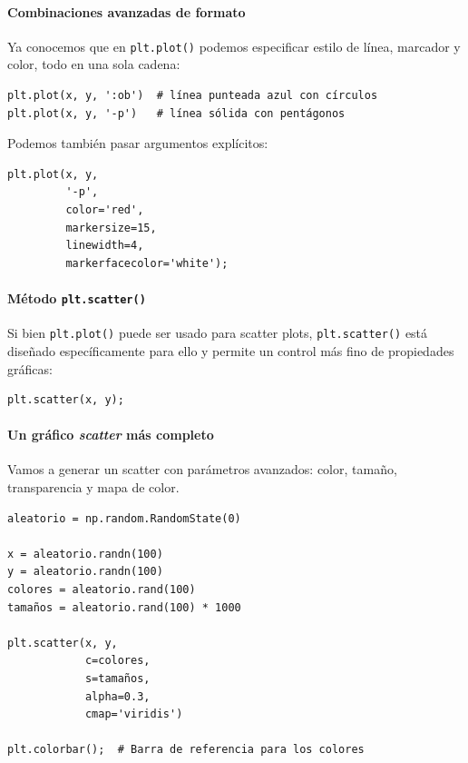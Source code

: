 \documentclass{article}
\theoremstyle{nonumberplain}
\begin{document}
\paragraph{Combinaciones avanzadas de formato}

Ya conocemos que en \texttt{plt.plot()} podemos especificar estilo de línea, marcador y color, todo en una sola cadena:

\begin{verbatim}
plt.plot(x, y, ':ob')  # línea punteada azul con círculos
plt.plot(x, y, '-p')   # línea sólida con pentágonos
\end{verbatim}

Podemos también pasar argumentos explícitos:

\begin{verbatim}
plt.plot(x, y,
         '-p',
         color='red',
         markersize=15,
         linewidth=4,
         markerfacecolor='white');
\end{verbatim}

\paragraph{Método \texttt{plt.scatter()}}

Si bien \texttt{plt.plot()} puede ser usado para scatter plots, \texttt{plt.scatter()} está diseñado específicamente para ello y permite un control más fino de propiedades gráficas:

\begin{verbatim}
plt.scatter(x, y);
\end{verbatim}

\paragraph{Un gráfico \textit{scatter} más completo}

Vamos a generar un scatter con parámetros avanzados: color, tamaño, transparencia y mapa de color.

\begin{verbatim}
aleatorio = np.random.RandomState(0)

x = aleatorio.randn(100)
y = aleatorio.randn(100)
colores = aleatorio.rand(100)
tamaños = aleatorio.rand(100) * 1000

plt.scatter(x, y,
            c=colores,
            s=tamaños,
            alpha=0.3,
            cmap='viridis')

plt.colorbar();  # Barra de referencia para los colores
\end{verbatim}
\end{document}
